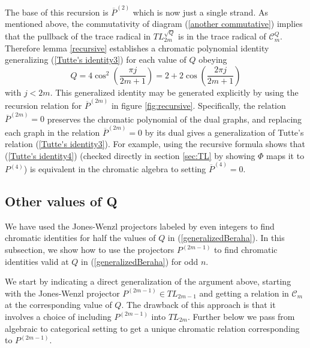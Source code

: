 \documentclass[11pt]{amsart}
\numberwithin{equation}{section}
\theoremstyle{definition}
\begin{document}
The base of this recursion is $\overline P^{(2)}$ which is now just a
single strand.  As mentioned above, the commutativity of diagram
(\ref{another commutative}) implies that the pullback of the trace
radical in $TL^{\sqrt{Q}}_{2m}$ is in the trace radical of ${\mathcal
  C}_m^{Q}$.  Therefore lemma \ref{recursive} establishes
a chromatic polynomial identity generalizing
(\ref{Tutte's identity3}) for each
value of $Q$ obeying
$$Q=4\cos^2\left(\frac{\pi j}{2m+1}\right) = 2+ 2\cos\left(\frac{2\pi
  j}{2m+1}\right)$$ with $j<2m$. This generalized identity may be
generated explicitly by using the recursion relation for $\overline
P^{(2m)}$ in figure \ref{fig:recursive}.  Specifically, the relation
$\overline P^{(2m)}=0$ preserves the chromatic polynomial of the dual
graphs, and replacing each graph in the relation $\overline
P^{(2m)}=0$ by its dual gives a generalization of Tutte's relation
(\ref{Tutte's identity3}).  For example, using the recursive formula
shows that (\ref{Tutte's identity4}) (checked directly in section
\ref{sec:TL} by showing ${\Phi}$ maps it to $P^{(4)}$) is equivalent in
the chromatic algebra to setting $\overline P^{(4)}=0$.


\subsection{Other values of Q}
We have used the Jones-Wenzl projectors labeled by even integers to find chromatic
identities for half the values of $Q$ in (\ref{generalizedBeraha}). In
this subsection, we show how to use the projectors $P^{(2m-1)}$ to
find chromatic identities valid at $Q$ in (\ref{generalizedBeraha})
for odd $n$.

We start by indicating a direct generalization of the argument above, starting
with the Jones-Wenzl projector $P^{(2m-1)}\in TL_{2m-1}$ and getting a relation
in ${\mathcal C}_m$ at the corresponding value of $Q$. The drawback of this approach is that
it involves a choice of including $P^{(2m-1)}$ into $TL_{2m}$. Further below we pass from algebraic
to categorical setting to get a unique chromatic relation corresponding to $P^{(2m-1)}$.
\end{document}
